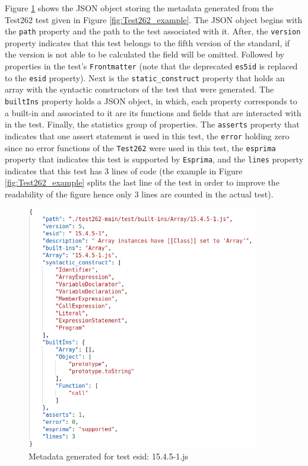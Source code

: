 \documentclass[runningheads]{llncs}
\begin{document}
Figure \ref{fig:json_metadata} shows the JSON object storing the metadata generated from the Test262 test given in Figure \ref{fig:Test262_example}. 
The JSON object begins with the \texttt{path} property and the path to the test associated with it. After, the \texttt{version} property indicates that this test belongs to the fifth version of the standard, if the version is not able to be calculated the field will be omitted. Followed by properties in the test's \texttt{Frontmatter} (note that the deprecated \texttt{es5id} is replaced to the \texttt{esid} property).
Next is the \texttt{static\_construct} property that holds an array with the syntactic constructors of the test that were generated. The \texttt{builtIns} property holds a JSON object, in which, each property corresponds to a built-in and associated to it are its functions and fields that are interacted with in the test. Finally, the statistics group of properties. The \texttt{asserts} property that indicates that one assert statement is used in this test, the \texttt{error} holding zero since no error functions of the \texttt{Test262} were used in this test, the \texttt{esprima} property that indicates this test is supported by \texttt{Esprima}, and the \texttt{lines} property indicates that this test has 3 lines of code (the example in Figure \ref{fig:Test262_example} splits the last line of the test in order to improve the readability of the figure hence only 3 lines are counted in the actual test).


\begin{figure}[ht]
    \centering
    \includegraphics[width=0.9\textwidth]{images/json_metadata.png}
    \caption{Metadata generated for test esid: 15.4.5-1.js}
    \label{fig:json_metadata}
\end{figure}
\end{document}
